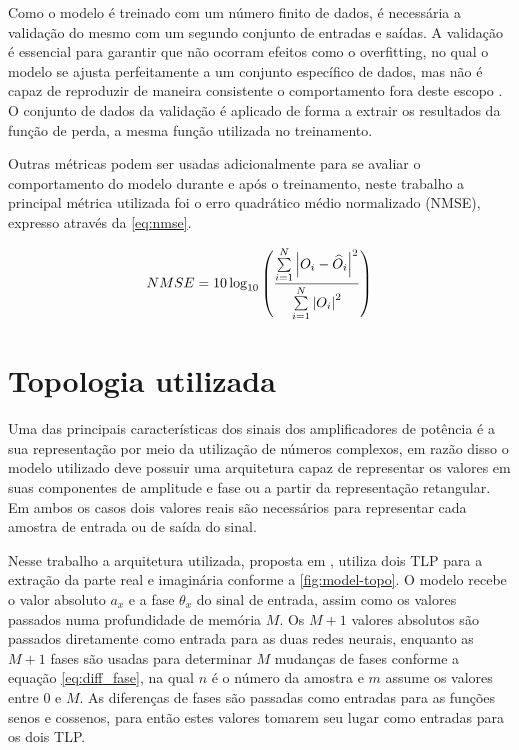 Como o modelo é treinado com um número finito de dados, é necessária a validação do mesmo com um segundo conjunto de entradas e saídas. A validação é essencial para garantir que não ocorram efeitos como o overfitting, no qual o modelo se ajusta perfeitamente a um conjunto específico de dados, mas não é capaz de reproduzir de maneira consistente o comportamento fora deste escopo \cite{haykin1999neural}. O conjunto de dados da validação é aplicado de forma a extrair os resultados da função de perda, a mesma função utilizada no treinamento.

Outras métricas podem ser usadas adicionalmente para se avaliar o comportamento do modelo durante e após o treinamento, neste trabalho a principal métrica utilizada foi o erro quadrático médio normalizado (NMSE), expresso através da \autoref{eq:nmse}.

\begin{align}
NMSE = 10\log_{10}
\left(
\frac
{\sum\limits_{i=1}^{N}
\abs{O_{i}-\widehat{O}_{i}}^{2}}
{\sum\limits_{i=1}^{N}
\abs{O_{i}}^2}
\right)
\label{eq:nmse}
\end{align}

\section{Topologia utilizada} \label{sec:model-topo}
Uma das principais características dos sinais dos amplificadores de potência é a sua representação por meio da utilização de números complexos, em razão disso o modelo utilizado deve possuir uma arquitetura capaz de representar os valores em suas componentes de amplitude e fase ou a partir da representação retangular. Em ambos os casos dois valores reais são necessários para representar cada amostra de entrada ou de saída do sinal.

Nesse trabalho a arquitetura utilizada, proposta em \cite{chipansky_freire_modfied_2015}, utiliza dois TLP para a extração da parte real e imaginária conforme a \autoref{fig:model-topo}. O modelo recebe o valor absoluto $a_x$ e a fase $\theta_x$ do sinal de entrada, assim como os valores passados numa profundidade de memória $M$. Os $M+1$ valores absolutos são passados diretamente como entrada para as duas redes neurais, enquanto as $M+1$ fases são usadas para determinar $M$ mudanças de fases conforme a equação \autoref{eq:diff_fase}, na qual $n$ é o número da amostra e $m$ assume os valores entre $0$ e $M$. As diferenças de fases são passadas como entradas para as funções senos e cossenos, para então estes valores tomarem seu lugar como entradas para os dois TLP.

